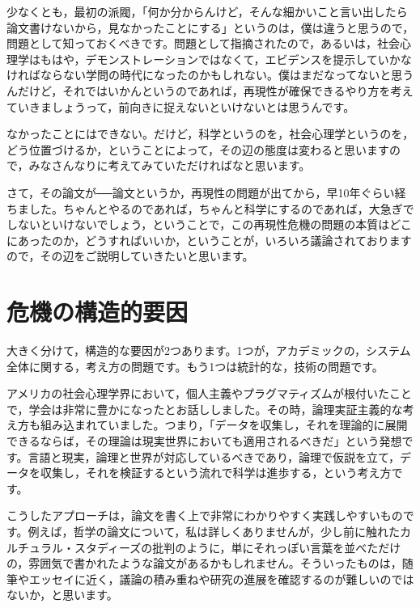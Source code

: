 \documentclass{ltjsbook}
\begin{document}
少なくとも，最初の派閥，「何か分からんけど，そんな細かいこと言い出したら論文書けないから，見なかったことにする」というのは，僕は違うと思うので，問題として知っておくべきです。問題として指摘されたので，あるいは，社会心理学はもはや，デモンストレーションではなくて，エビデンスを提示していかなければならない学問の時代になったのかもしれない。僕はまだなってないと思うんだけど，それではいかんというのであれば，再現性が確保できるやり方を考えていきましょうって，前向きに捉えないといけないとは思うんです。

なかったことにはできない。だけど，科学というのを，社会心理学というのを，どう位置づけるか，ということによって，その辺の態度は変わると思いますので，みなさんなりに考えてみていただければなと思います。

さて，その論文が──論文というか，再現性の問題が出てから，早10年ぐらい経ちました。ちゃんとやるのであれば，ちゃんと科学にするのであれば，大急ぎでしないといけないでしょう，ということで，この再現性危機の問題の本質はどこにあったのか，どうすればいいか，ということが，いろいろ議論されておりますので，その辺をご説明していきたいと思います。

\section{危機の構造的要因}

大きく分けて，構造的な要因が2つあります。1つが，アカデミックの，システム全体に関する，考え方の問題です。もう1つは統計的な，技術の問題です。

アメリカの社会心理学界において，個人主義やプラグマティズムが根付いたことで，学会は非常に豊かになったとお話ししました。その時，論理実証主義的な考え方も組み込まれていました。つまり，「データを収集し，それを理論的に展開できるならば，その理論は現実世界においても適用されるべきだ」という発想です。言語と現実，論理と世界が対応しているべきであり，論理で仮説を立て，データを収集し，それを検証するという流れで科学は進歩する，という考え方です。

こうしたアプローチは，論文を書く上で非常にわかりやすく実践しやすいものです。例えば，哲学の論文について，私は詳しくありませんが，少し前に触れたカルチュラル・スタディーズの批判のように，単にそれっぽい言葉を並べただけの，雰囲気で書かれたような論文があるかもしれません。そういったものは，随筆やエッセイに近く，議論の積み重ねや研究の進展を確認するのが難しいのではないか，と思います。
\end{document}
